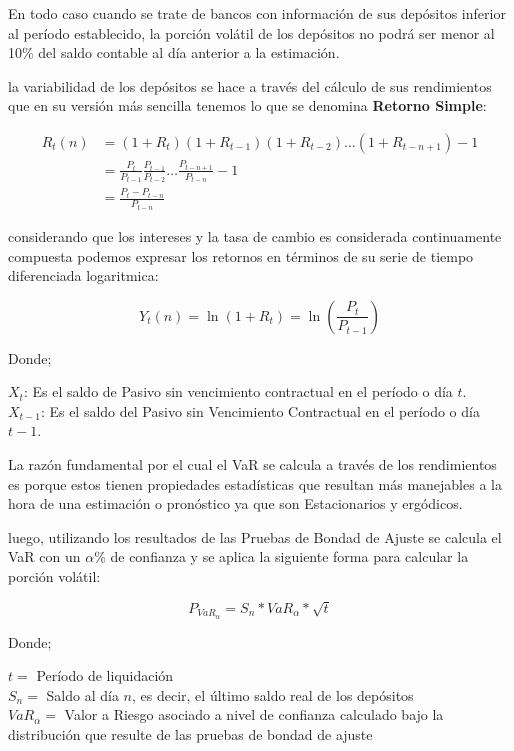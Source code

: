 \documentclass[10pt,]{article}
\begin{document}
En todo caso cuando se trate de bancos con información de sus depósitos
inferior al período establecido, la porción volátil de los depósitos no
podrá ser menor al 10\% del saldo contable al día anterior a la
estimación.

la variabilidad de los depósitos se hace a través del cálculo de sus
rendimientos que en su versión más sencilla tenemos lo que se denomina
\textbf{Retorno Simple}:

\[\begin{array}{rl}
R_{t}(n) &\displaystyle= \left(1+R_{t}\right) \left(1+R_{t-1}\right) \left(1+R_{t-2}\right) \ldots \left(1+R_{t-n+1}\right) -1\\
&\displaystyle= \frac{P_t}{P_{t-1}} \frac{P_{t-1}}{P_{t-2}} \ldots \frac{P_{t-n+1}}{P_{t-n}}-1\\
&\displaystyle= \frac{P_{t}-P_{t-n}}{P_{t-n}}
\end{array}\]

considerando que los intereses y la tasa de cambio es considerada
continuamente compuesta podemos expresar los retornos en términos de su
serie de tiempo diferenciada logaritmica:

\[Y_{t}(n)=\ln(1+R_{t})=\ln \left(\frac{P_{t}}{P_{t-1}}\right)\]

Donde;

\(X_t\): Es el saldo de Pasivo sin vencimiento contractual en el período
o día \(t\).\\
\(X_{t-1}\): Es el saldo del Pasivo sin Vencimiento Contractual en el
período o día \(t-1\).

La razón fundamental por el cual el VaR se calcula a través de los
rendimientos es porque estos tienen propiedades estadísticas que
resultan más manejables a la hora de una estimación o pronóstico ya que
son Estacionarios y ergódicos.

luego, utilizando los resultados de las Pruebas de Bondad de Ajuste se
calcula el VaR con un \(\alpha\)\% de confianza y se aplica la siguiente
forma para calcular la porción volátil:

\[P_{VaR_{\alpha}} = S_n * VaR_{\alpha} * \sqrt{t}\]

Donde;

\(t=\) Período de liquidación\\
\(S_n=\) Saldo al día \(n\), es decir, el último saldo real de los
depósitos\\
\(VaR_{\alpha}=\) Valor a Riesgo asociado a nivel de confianza calculado
bajo la distribución que resulte de las pruebas de bondad de ajuste
\end{document}
